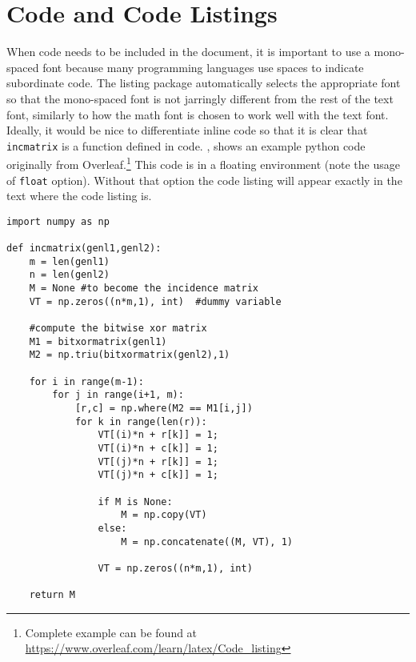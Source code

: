 \section{Code and Code Listings} \label{sec:CodeAndCodeListings}
    When code needs to be included in the document, it is important to use a mono-spaced font because many programming languages use spaces to indicate subordinate code.
    The listing package automatically selects the appropriate font so that the mono-spaced font is not jarringly different from the rest of the text font, similarly to how the math font is chosen to work well with the text font.
    Ideally, it would be nice to differentiate inline code so that it is clear that \lstinline|incmatrix| is a function defined in code.
    , shows an example python code originally from Overleaf.\footnote{Complete example can be found at \url{https://www.overleaf.com/learn/latex/Code_listing}}
    This code is in a floating environment (note the usage of \lstinline|float| option).
    Without that option the code listing will appear exactly in the text where the code listing is.

    \begin{lstlisting}[float, caption=Example from Overleaf demonstrating python code. A monospaced font is important to see what statement the return lines up with., label=lst:OverleafCode]
import numpy as np

def incmatrix(genl1,genl2):
    m = len(genl1)
    n = len(genl2)
    M = None #to become the incidence matrix
    VT = np.zeros((n*m,1), int)  #dummy variable

    #compute the bitwise xor matrix
    M1 = bitxormatrix(genl1)
    M2 = np.triu(bitxormatrix(genl2),1)

    for i in range(m-1):
        for j in range(i+1, m):
            [r,c] = np.where(M2 == M1[i,j])
            for k in range(len(r)):
                VT[(i)*n + r[k]] = 1;
                VT[(i)*n + c[k]] = 1;
                VT[(j)*n + r[k]] = 1;
                VT[(j)*n + c[k]] = 1;

                if M is None:
                    M = np.copy(VT)
                else:
                    M = np.concatenate((M, VT), 1)

                VT = np.zeros((n*m,1), int)

    return M
    \end{lstlisting}
